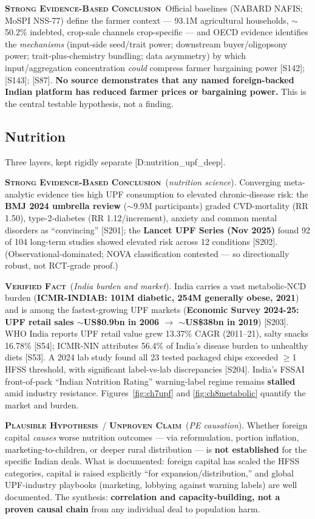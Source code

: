 \documentclass[11pt,a4paper]{article}
\newcommand{\VF}{\textcolor{vfcol}{\textsc{\textbf{Verified Fact}}}}
\newcommand{\SE}{\textcolor{secol}{\textsc{\textbf{Strong Evidence-Based Conclusion}}}}
\newcommand{\PH}{\textcolor{phcol}{\textsc{\textbf{Plausible Hypothesis}}}}
\newcommand{\UC}{\textcolor{uccol}{\textsc{\textbf{Unproven Claim}}}}
\newcommand{\cs}[1]{\textnormal{[#1]}}
\begin{document}
\SE\ Official baselines (NABARD NAFIS; MoSPI NSS-77) define the farmer context --- 93.1M agricultural households, $\sim$50.2\% indebted, crop-sale channels crop-specific --- and OECD evidence identifies the \emph{mechanisms} (input-side seed/trait power; downstream buyer/oligopsony power; trait-plus-chemistry bundling; data asymmetry) by which input/aggregation concentration \emph{could} compress farmer bargaining power \cs{S142}; \cs{S143}; \cs{S87}. \textbf{No source demonstrates that any named foreign-backed Indian platform has reduced farmer prices or bargaining power.} This is the central testable hypothesis, not a finding.

\subsection{Nutrition}\label{sec:nutrition}

Three layers, kept rigidly separate \cs{D:nutrition\_upf\_deep}.

\SE\ (\emph{nutrition science}). Converging meta-analytic evidence ties high UPF consumption to elevated chronic-disease risk: the \textbf{BMJ 2024 umbrella review} ($\sim$9.9M participants) graded CVD-mortality (RR 1.50), type-2-diabetes (RR 1.12/increment), anxiety and common mental disorders as ``convincing'' \cs{S201}; the \textbf{Lancet UPF Series (Nov 2025)} found 92 of 104 long-term studies showed elevated risk across 12 conditions \cs{S202}. (Observational-dominated; NOVA classification contested --- so directionally robust, not RCT-grade proof.)

\VF\ (\emph{India burden and market}). India carries a vast metabolic-NCD burden (\textbf{ICMR-INDIAB: 101M diabetic, 254M generally obese, 2021}) and is among the fastest-growing UPF markets (\textbf{Economic Survey 2024-25: UPF retail sales $\sim$US\$0.9bn in 2006 $\rightarrow$ $\sim$US\$38bn in 2019}) \cs{S203}. WHO India reports UPF retail value grew 13.37\% CAGR (2011--21), salty snacks 16.78\% \cs{S54}; ICMR-NIN attributes 56.4\% of India's disease burden to unhealthy diets \cs{S53}. A 2024 lab study found all 23 tested packaged chips exceeded $\ge$1 HFSS threshold, with significant label-vs-lab discrepancies \cs{S204}. India's FSSAI front-of-pack ``Indian Nutrition Rating'' warning-label regime remains \textbf{stalled} amid industry resistance. Figures~\ref{fig:ch7upf} and \ref{fig:ch8metabolic} quantify the market and burden.

\PH\ / \UC\ (\emph{PE causation}). Whether foreign capital \emph{causes} worse nutrition outcomes --- via reformulation, portion inflation, marketing-to-children, or deeper rural distribution --- is \textbf{not established} for the specific Indian deals. What is documented: foreign capital has scaled the HFSS categories, capital is raised explicitly ``for expansion/distribution,'' and global UPF-industry playbooks (marketing, lobbying against warning labels) are well documented. The synthesis: \textbf{correlation and capacity-building, not a proven causal chain} from any individual deal to population harm.
\end{document}
